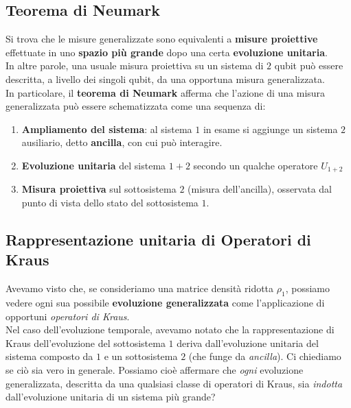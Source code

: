 \documentclass[../../InformazioneQuantistica.tex]{subfiles}
\begin{document}
\subsection{Teorema di Neumark}
Si trova che le misure generalizzate sono equivalenti a \textbf{misure proiettive} effettuate in uno \textbf{spazio più grande} dopo una certa \textbf{evoluzione unitaria}.\\

In altre parole, una usuale misura proiettiva su un sistema di $2$ qubit può essere descritta, a livello dei singoli qubit, da una opportuna misura generalizzata.\\

In particolare, il \textbf{teorema di Neumark} afferma che l'azione di una misura generalizzata può essere schematizzata come una sequenza di:
\begin{enumerate}
\item \textbf{Ampliamento del sistema}: al sistema $1$ in esame si aggiunge un sistema $2$ ausiliario, detto \textbf{ancilla}, con cui può interagire.
\item \textbf{Evoluzione unitaria} del sistema $1+2$ secondo un qualche operatore $U_{1+2}$
\item \textbf{Misura proiettiva} sul sottosistema $2$ (misura dell'ancilla), osservata dal punto di vista dello stato del sottosistema $1$.
\end{enumerate}

\subsection{Rappresentazione unitaria di Operatori di Kraus}
Avevamo visto che, se consideriamo una matrice densità ridotta $\rho_1$, possiamo vedere ogni sua possibile \textbf{evoluzione generalizzata} come l'applicazione di opportuni \textit{operatori di Kraus}.\\ Nel caso dell'evoluzione temporale, avevamo notato che la rappresentazione di Kraus dell'evoluzione del sottosistema $1$ deriva dall'evoluzione unitaria del sistema composto da $1$ e un sottosistema $2$ (che funge da \textit{ancilla}). Ci chiediamo se ciò sia vero in generale. Possiamo cioè affermare che \textit{ogni} evoluzione generalizzata, descritta da una qualsiasi classe di operatori di Kraus, sia \textit{indotta} dall'evoluzione unitaria di un sistema più grande?

\begin{figure}[H]
    \centering
    
\end{figure}
\end{document}
